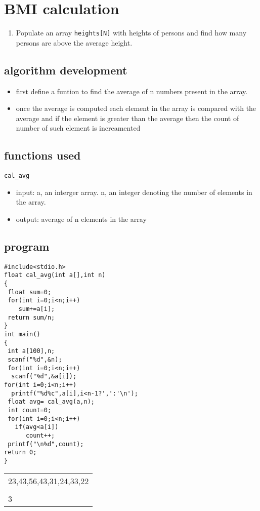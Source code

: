 \documentclass[11pt]{article}
\begin{document}
\section{BMI calculation}
\label{sec-3}
\begin{enumerate}
\item Populate an array \texttt{heights[N]} with heights of persons
and find how many persons are above the average height.
\end{enumerate}
\subsection{algorithm development}
\label{sec-3-1}
\begin{itemize}
\item first define a funtion to find the average of n numbers 
present in the array.
\item once the average is computed each element in the array 
is compared with the average and if the element is greater than 
the  average then the count of number of such element is increamented
\end{itemize}
\subsection{functions used}
\label{sec-3-2}
\texttt{cal\_avg}
\begin{itemize}
\item input: a, an interger array. 
n, an integer denoting the number of elements in the array.
\item output: average of n elements in the array
\end{itemize}

\subsection{program}
\label{sec-3-3}
\begin{verbatim}
#include<stdio.h>
float cal_avg(int a[],int n)
{
 float sum=0;
 for(int i=0;i<n;i++)
    sum+=a[i];
 return sum/n;
}
int main()
{
 int a[100],n;
 scanf("%d",&n);
 for(int i=0;i<n;i++)
  scanf("%d",&a[i]);
for(int i=0;i<n;i++)
  printf("%d%c",a[i],i<n-1?',':'\n');
 float avg= cal_avg(a,n);
 int count=0;
 for(int i=0;i<n;i++)
   if(avg<a[i])
      count++;
 printf("\n%d",count);
return 0;
}
\end{verbatim}

\begin{center}
\begin{tabular}{l}
23,43,56,43,31,24,33,22\\
\\
3\\
\end{tabular}
\end{center}
\end{document}
